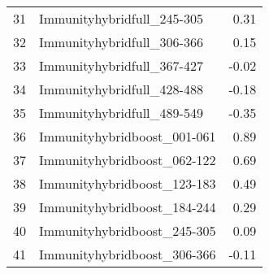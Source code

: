 \begin{table}[ht]
\begin{tabular}{rlr}
  31 & Immunityhybridfull\_245-305 & 0.31 \\ 
  32 & Immunityhybridfull\_306-366 & 0.15 \\ 
  33 & Immunityhybridfull\_367-427 & -0.02 \\ 
  34 & Immunityhybridfull\_428-488 & -0.18 \\ 
  35 & Immunityhybridfull\_489-549 & -0.35 \\ 
  36 & Immunityhybridboost\_001-061 & 0.89 \\ 
  37 & Immunityhybridboost\_062-122 & 0.69 \\ 
  38 & Immunityhybridboost\_123-183 & 0.49 \\ 
  39 & Immunityhybridboost\_184-244 & 0.29 \\ 
  40 & Immunityhybridboost\_245-305 & 0.09 \\ 
  41 & Immunityhybridboost\_306-366 & -0.11 \\ 
   \hline
\end{tabular}
\end{table}
